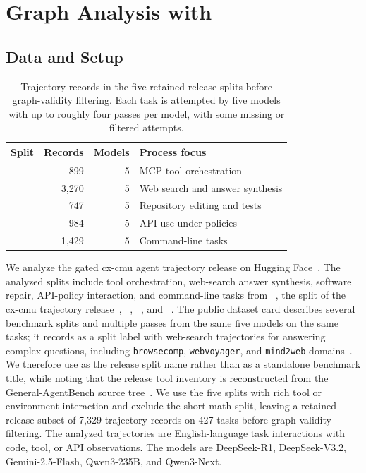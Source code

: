 \section{Graph Analysis with \method{}}
\label{sec:experiments}

\subsection{Data and Setup}
\label{sec:data}

\begin{table}[H]
\centering
\scriptsize
\setlength{\tabcolsep}{3pt}
\begin{tabularx}{\linewidth}{lrrX}
\toprule
\textbf{Split} & \textbf{Records} & \textbf{Models} & \textbf{Process focus} \\
\midrule
\mcp{} & 899 & 5 & MCP tool orchestration \\
\searchb{} & 3,270 & 5 & Web search and answer synthesis \\
\swe{} & 747 & 5 & Repository editing and tests \\
\taub{} & 984 & 5 & API use under policies \\
\terminal{} & 1,429 & 5 & Command-line tasks \\
\bottomrule
\end{tabularx}
\caption{Trajectory records in the five retained release splits before graph-validity filtering. Each task is attempted by five models with up to roughly four passes per model, with some missing or filtered attempts.}
\label{tab:data}
\end{table}

We analyze the gated cx-cmu agent trajectory release on Hugging Face~\citep{cxcmu2026agenttrajectories}.
The analyzed splits include tool orchestration, web-search answer synthesis, software repair, API-policy interaction, and command-line tasks from \mcp{}~\citep{wang2025mcpbench}, the \searchb{} split of the cx-cmu trajectory release~\citep{cxcmu2026agenttrajectories}, \swe{}~\citep{jimenez2024swebench}, \taub{}~\citep{barres2025tau2}, and \terminal{}~\citep{merrill2026terminalbench}.
The public dataset card describes several benchmark splits and multiple passes from the same five models on the same tasks; it records \searchb{} as a split label with web-search trajectories for answering complex questions, including \texttt{browsecomp}, \texttt{webvoyager}, and \texttt{mind2web} domains~\citep{cxcmu2026agenttrajectories}. We therefore use \searchb{} as the release split name rather than as a standalone benchmark title, while noting that the release tool inventory is reconstructed from the General-AgentBench source tree~\citep{cxcmu2026agenttrajectories,li2026generalagentbench}.
We use the five splits with rich tool or environment interaction and exclude the short math split, leaving a retained release subset of 7,329 trajectory records on 427 tasks before graph-validity filtering.
The analyzed trajectories are English-language task interactions with code, tool, or API observations.
The models are DeepSeek-R1, DeepSeek-V3.2, Gemini-2.5-Flash, Qwen3-235B, and Qwen3-Next.

